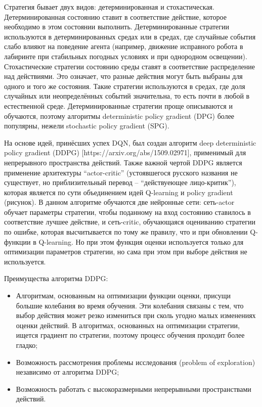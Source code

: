 Стратегия бывает двух видов: детерминированная и стохастическая. Детерминированная состоянию ставит в соответствие действие, которое необходимо в этом состоянии выполнить. Детерминированные стратегии используются в детерминированных средах или в средах, где случайные события слабо влияют на поведение агента (например, движение исправного робота в лабиринте при стабильных погодных условиях и при однородном освещении). Стохастические стратегии состоянию среды ставят в соответствие распределение над действиями. Это означает, что разные действия могут быть выбраны для одного и того же состояния. Такие стратегии используются в средах, где доля случайных или неопределённых событий значительна, то есть почти в любой в естественной среде. Детерминированные стратегии проще описываются и обучаются, поэтому алгоритмы deterministic policy gradient (DPG) более популярны, нежели stochastic policy gradient (SPG).

На основе идей, принёсших успех DQN, был создан алгоритм deep deterministic policy gradient (DDPG) [https://arxiv.org/abs/1509.02971], применимый для непрерывного пространства действий. Также важной чертой DDPG является применение архитектуры “actor-critic” (устоявшегося русского названия не существует, но приблизительный перевод – “действуеющее лицо-критик”), которая является по сути объединением идей Q-learning и policy gradient (рисунок). 
В данном алгоритме обучаются две нейронные сети: сеть-actor обучает параметры стратегии, чтобы поданному на вход состоянию ставилось в соответствие лучшее действие, и сеть-critic, обучающаяся оцениванию стратегии по ошибке, которая высчитывается по тому же правилу, что и при обновлении Q-функции в Q-learning. Но при этом функция оценки используется только для оптимизации параметров стратегии, но сама при этом при выборе действия не используется. 

Преимущества алгоритма DDPG:
\begin{itemize}
	\item Алгоритмам, основанным на оптимизации функции оценки, присущи большие колебания во время обучения. Эти колебания связаны с тем, что выбор действия может резко измениться при сколь угодно малых изменениях оценки действий. В алгоритмах, основанных на оптимизации стратегии, ищется градиент по стратегии, поэтому процесс обучения проходит более гладко;
	\item Возможность рассмотрения проблемы исследования (problem of exploration) независимо от алгоритма DDPG;
	\item Возможность работать с высокоразмерными непрерывными пространствами действий.
\end{itemize}

